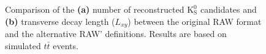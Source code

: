 \begin{figure}[h]
    \caption[Reconstruction of $\mathrm{K}_\mathrm{S}^0$ candidates and $L_{xy}$ for RAW and RAW']{Comparison of the \textbf{(a)} number of reconstructed $\mathrm{K}_\mathrm{S}^0$ candidates and \textbf{(b)} transverse decay length ($L_{xy}$) between the original RAW format and the alternative RAW' definitions. Results are based on simulated $t\bar{t}$ events.}
    \label{Figure:Chapter5_KsReconstruction}
\end{figure}